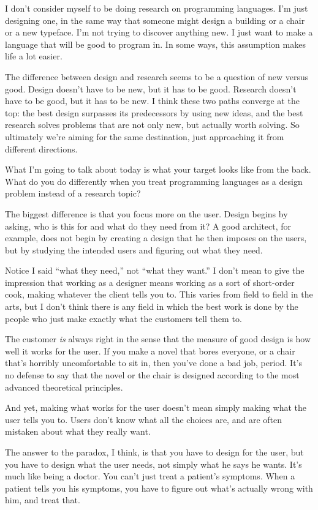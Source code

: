 \documentclass[12pt]{book}
\begin{document}
I don't consider myself to be doing research on programming languages.
I'm just designing one, in the same way that someone might design a
building or a chair or a new typeface. I'm not trying to discover
anything new. I just want to make a language that will be good to
program in. In some ways, this assumption makes life a lot easier.

The difference between design and research seems to be a question of new
versus good. Design doesn't have to be new, but it has to be good.
Research doesn't have to be good, but it has to be new. I think these
two paths converge at the top: the best design surpasses its
predecessors by using new ideas, and the best research solves problems
that are not only new, but actually worth solving. So ultimately we're
aiming for the same destination, just approaching it from different
directions.

What I'm going to talk about today is what your target looks like from
the back. What do you do differently when you treat programming
languages as a design problem instead of a research topic?

The biggest difference is that you focus more on the user. Design begins
by asking, who is this for and what do they need from it? A good
architect, for example, does not begin by creating a design that he then
imposes on the users, but by studying the intended users and figuring
out what they need.

Notice I said ``what they need,'' not ``what they want.'' I don't mean
to give the impression that working as a designer means working as a
sort of short-order cook, making whatever the client tells you to. This
varies from field to field in the arts, but I don't think there is any
field in which the best work is done by the people who just make exactly
what the customers tell them to.

The customer \emph{is} always right in the sense that the measure of
good design is how well it works for the user. If you make a novel that
bores everyone, or a chair that's horribly uncomfortable to sit in, then
you've done a bad job, period. It's no defense to say that the novel or
the chair is designed according to the most advanced theoretical
principles.

And yet, making what works for the user doesn't mean simply making what
the user tells you to. Users don't know what all the choices are, and
are often mistaken about what they really want.

The answer to the paradox, I think, is that you have to design for the
user, but you have to design what the user needs, not simply what he
says he wants. It's much like being a doctor. You can't just treat a
patient's symptoms. When a patient tells you his symptoms, you have to
figure out what's actually wrong with him, and treat that.
\end{document}
